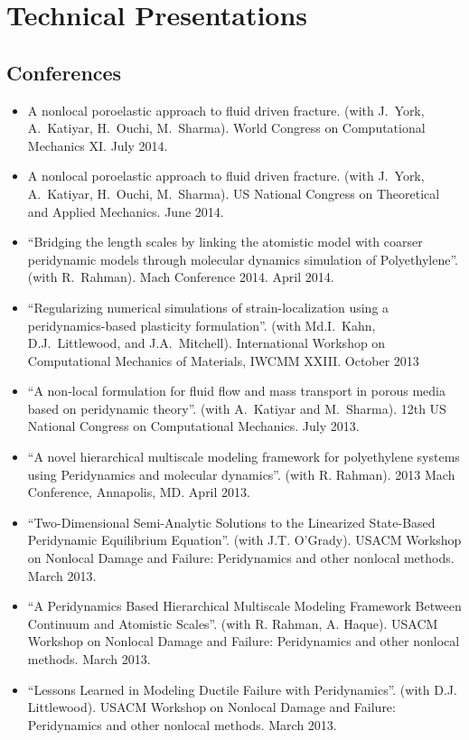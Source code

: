 \section*{Technical Presentations}

\subsection*{Conferences}

\begin{itemize}
    \item A nonlocal poroelastic approach to fluid driven fracture. (with J.~York, A.~Katiyar, H.~Ouchi, M.~Sharma). World Congress on Computational Mechanics XI.  July 2014.
    \item A nonlocal poroelastic approach to fluid driven fracture. (with J.~York, A.~Katiyar, H.~Ouchi, M.~Sharma). US National Congress on Theoretical and Applied Mechanics.  June 2014.
    \item ``Bridging the length scales by linking the atomistic model with coarser peridynamic models through molecular dynamics simulation of Polyethylene''. (with R.~Rahman). Mach Conference 2014.  April 2014.
    \item ``Regularizing numerical simulations of strain-localization using a peridynamics-based plasticity formulation''. (with Md.I.~Kahn, D.J.~Littlewood, and J.A.~Mitchell). International Workshop on Computational Mechanics of Materials, IWCMM XXIII. October 2013
    \item ``A non-local formulation for fluid flow and mass transport in porous media based on peridynamic theory''. (with A.~Katiyar and M.~Sharma). 12th US National Congress on Computational Mechanics. July 2013.
    \item ``A novel hierarchical multiscale modeling framework for polyethylene systems using Peridynamics and molecular dynamics''. (with R. Rahman). 2013 Mach Conference, Annapolis, MD. April 2013. 
    \item ``Two-Dimensional Semi-Analytic Solutions to the Linearized State-Based Peridynamic Equilibrium Equation''. (with J.T. O'Grady). USACM Workshop on Nonlocal Damage and Failure: Peridynamics and other nonlocal methods. March 2013.
    \item ``A Peridynamics Based Hierarchical Multiscale Modeling Framework Between Continuum and Atomistic Scales''. (with R. Rahman, A. Haque). USACM Workshop on Nonlocal Damage and Failure: Peridynamics and other nonlocal methods. March 2013.
    \item ``Lessons Learned in Modeling Ductile Failure with Peridynamics''. (with D.J. Littlewood). USACM Workshop on Nonlocal Damage and Failure: Peridynamics and other nonlocal methods. March 2013.

\end{itemize}
